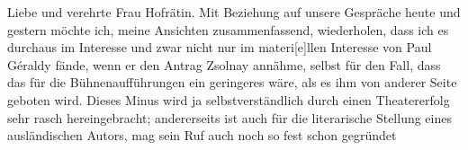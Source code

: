 \pstart{}Liebe und verehrte Frau Hofrätin.\pend\vspace{0.5em}
\pstart
           Mit Beziehung auf unsere Gespräche heute und gestern möchte
               ich, meine Ansichten zusammenfassend, wiederholen, dass ich es durchaus im Interesse
               und zwar nicht nur im materi{[}e{]}llen Interesse von Paul Géraldy fände, wenn er den Antrag Zsolnay annähme, selbst für den Fall, dass das
                  \label{K_L03970-1v}\label{K_L03970-1} für die Bühnenaufführungen ein geringeres wäre, als es ihm von
               anderer Seite geboten wird. Dieses Minus wird ja selbstverständlich durch einen
               Theatererfolg sehr rasch hereingebracht; andererseits ist auch für die literarische
               Stellung eines ausländischen Autors, mag sein Ruf auch noch so fest schon gegründet
